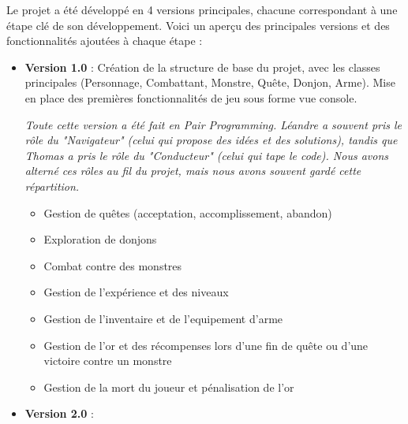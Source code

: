\documentclass{article}
\begin{document}
Le projet a été développé en 4 versions principales, chacune correspondant à une étape clé de son développement. Voici un aperçu des principales versions et des fonctionnalités ajoutées à chaque étape :

\begin{itemize}
    \item \textbf{Version 1.0} : Création de la structure de base du projet, avec les classes principales (Personnage, Combattant, Monstre, Quête, Donjon, Arme). Mise en place des premières fonctionnalités de jeu sous forme vue console.
    
    \textit{Toute cette version a été fait en Pair Programming. Léandre a souvent pris le rôle du "Navigateur" (celui qui propose des idées et des solutions), tandis que Thomas a pris le rôle du "Conducteur" (celui qui tape le code). Nous avons alterné ces rôles au fil du projet, mais nous avons souvent gardé cette répartition.}
    \begin{itemize}
        \item Gestion de quêtes (acceptation, accomplissement, abandon)
        \item Exploration de donjons
        \item Combat contre des monstres
        \item Gestion de l'expérience et des niveaux
        \item Gestion de l'inventaire et de l'equipement d'arme
        \item Gestion de l'or et des récompenses lors d'une fin de quête ou d'une victoire contre un monstre
        \item Gestion de la mort du joueur et pénalisation de l'or
    \end{itemize}
    
    \item \textbf{Version 2.0} : 
    

\end{itemize}
\end{document}
